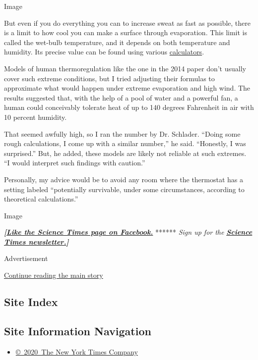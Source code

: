 Image

But even if you do everything you can to increase sweat as fast as
possible, there is a limit to how cool you can make a surface through
evaporation. This limit is called the wet-bulb temperature, and it
depends on both temperature and humidity. Its precise value can be found
using various \href{https://www.weather.gov/epz/wxcalc_rh}{calculators}.

Models of human thermoregulation like the one in the 2014 paper don't
usually cover such extreme conditions, but I tried adjusting their
formulas to approximate what would happen under extreme evaporation and
high wind. The results suggested that, with the help of a pool of water
and a powerful fan, a human could conceivably tolerate heat of up to 140
degrees Fahrenheit in air with 10 percent humidity.

That seemed awfully high, so I ran the number by Dr. Schlader. ``Doing
some rough calculations, I come up with a similar number,'' he said.
``Honestly, I was surprised.'' But, he added, these models are likely
not reliable at such extremes. ``I would interpret such findings with
caution.''

Personally, my advice would be to avoid any room where the thermostat
has a setting labeled ``potentially survivable, under some
circumstances, according to theoretical calculations.''

Image

\textbf{\emph{{[}}\href{http://on.fb.me/1paTQ1h}{\emph{Like the Science
Times page on Facebook.}}} ****** \emph{\textbar{} Sign up for the}
\textbf{\href{http://nyti.ms/1MbHaRU}{\emph{Science Times
newsletter.}}\emph{{]}}}

Advertisement

\protect\hyperlink{after-bottom}{Continue reading the main story}

\hypertarget{site-index}{%
\subsection{Site Index}\label{site-index}}

\hypertarget{site-information-navigation}{%
\subsection{Site Information
Navigation}\label{site-information-navigation}}

\begin{itemize}
\tightlist
\item
  \href{https://help.nytimes.com/hc/en-us/articles/115014792127-Copyright-notice}{©~2020~The
  New York Times Company}
\end{itemize}

